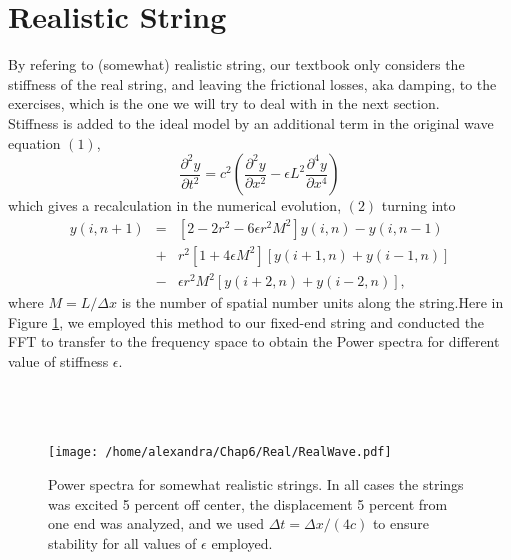 \documentclass[a4paper,11pt]{article}
\begin{document}
\section{Realistic String}
\normalsize By refering to (somewhat) realistic string, our textbook only considers the stiffness of the real string, and leaving the frictional losses, aka damping, to the exercises, which is the one we will try to deal with in the next section.\\
Stiffness is added to the ideal model by an additional term in the original wave equation $(1)$,
\begin{equation}
\frac{\partial ^2 y}{\partial t^2} = c^2 \left(\frac{\partial ^2 y}{\partial x^2}-\epsilon L^2 \frac{\partial ^4 y}{\partial x^4}\right)
\end{equation}
which gives a recalculation in the numerical evolution, $(2)$ turning into
\begin{eqnarray*}
y(i,n+1)&=&[2-2r^2-6\epsilon r^2 M^2]y(i,n)-y(i,n-1)\\
&+&r^2[1+4\epsilon M^2][y(i+1,n)+y(i-1,n)]\\
&-&\epsilon r^2 M^2[y(i+2,n)+y(i-2,n)],
\end{eqnarray*}
where $M=L/\Delta x$ is the number of spatial number units along the string.Here in Figure \ref{fig5}, we employed this method to our fixed-end string and conducted the FFT to transfer to the frequency space to obtain the Power spectra for different value of stiffness $\epsilon$.\\\\\\\\

\begin{figure}[htbp]
\centering
\texttt{[image: /home/alexandra/Chap6/Real/RealWave.pdf]}
\caption{\sf \footnotesize Power spectra for somewhat realistic strings. In all cases the strings was excited 5 percent off center, the displacement 5 percent from one end was analyzed, and we used $\Delta t = \Delta x/(4c)$ to ensure stability for all values of $\epsilon$ employed.}
\label{fig5}
\end{figure}

\newpage
\end{document}
